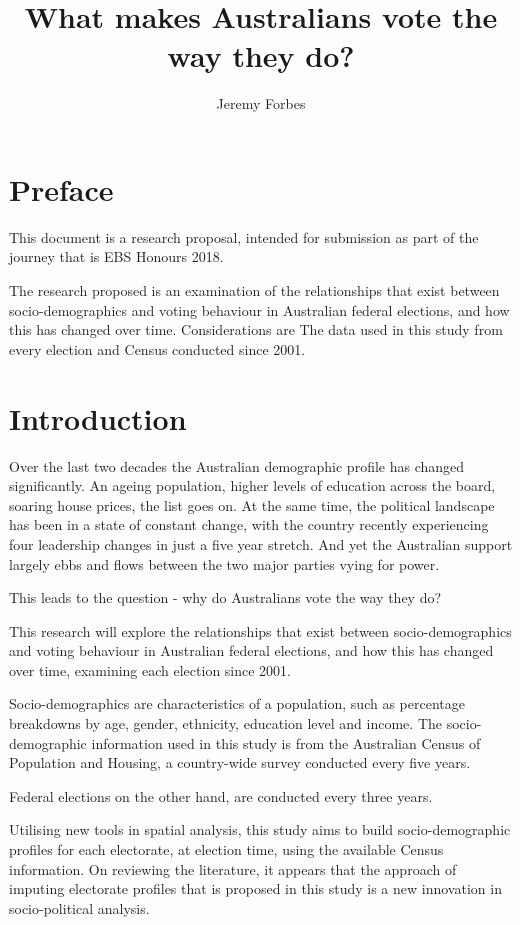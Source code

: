 \documentclass{monashthesis}
\author{Jeremy Forbes}
\title{What makes Australians vote the way they do?}
\theoremstyle{definition}
\theoremstyle{definition}
\theoremstyle{definition}
\theoremstyle{remark}
\begin{document}

\titlepage

{\sf\tighttoc\doublespacing}

\chapter*{Preface}\label{preface}

This document is a research proposal, intended for submission as part of
the journey that is EBS Honours 2018.

The research proposed is an examination of the relationships that exist
between socio-demographics and voting behaviour in Australian federal
elections, and how this has changed over time. Considerations are The
data used in this study from every election and Census conducted since
2001.

\chapter{Introduction}\label{ch:intro}

Over the last two decades the Australian demographic profile has changed
significantly. An ageing population, higher levels of education across
the board, soaring house prices, the list goes on. At the same time, the
political landscape has been in a state of constant change, with the
country recently experiencing four leadership changes in just a five
year stretch. And yet the Australian support largely ebbs and flows
between the two major parties vying for power.

This leads to the question - why do Australians vote the way they do?

This research will explore the relationships that exist between
socio-demographics and voting behaviour in Australian federal elections,
and how this has changed over time, examining each election since 2001.

Socio-demographics are characteristics of a population, such as
percentage breakdowns by age, gender, ethnicity, education level and
income. The socio-demographic information used in this study is from the
Australian Census of Population and Housing, a country-wide survey
conducted every five years.

Federal elections on the other hand, are conducted every three years.

Utilising new tools in spatial analysis, this study aims to build
socio-demographic profiles for each electorate, at election time, using
the available Census information. On reviewing the literature, it
appears that the approach of imputing electorate profiles that is
proposed in this study is a new innovation in socio-political analysis.
\end{document}
